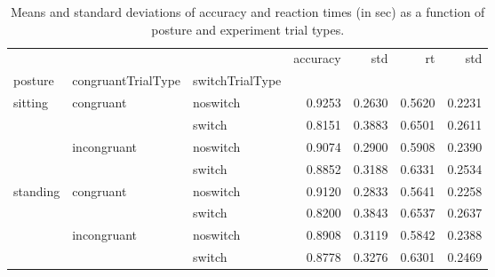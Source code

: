 \begin{table}
\centering
\caption{Means and standard deviations of accuracy and reaction times (in sec) as a function of posture and experiment trial types.}
\label{table-task-switching-replication-reaction-time}
\begin{tabular}{lllrrrr}
\toprule
         &             &        & accuracy &    std &     rt &    std \\
posture & congruantTrialType & switchTrialType &          &        &        &        \\
\midrule
sitting & congruant & noswitch &   0.9253 & 0.2630 & 0.5620 & 0.2231 \\
         &             & switch &   0.8151 & 0.3883 & 0.6501 & 0.2611 \\
         & incongruant & noswitch &   0.9074 & 0.2900 & 0.5908 & 0.2390 \\
         &             & switch &   0.8852 & 0.3188 & 0.6331 & 0.2534 \\
standing & congruant & noswitch &   0.9120 & 0.2833 & 0.5641 & 0.2258 \\
         &             & switch &   0.8200 & 0.3843 & 0.6537 & 0.2637 \\
         & incongruant & noswitch &   0.8908 & 0.3119 & 0.5842 & 0.2388 \\
         &             & switch &   0.8778 & 0.3276 & 0.6301 & 0.2469 \\
\bottomrule
\end{tabular}
\end{table}
